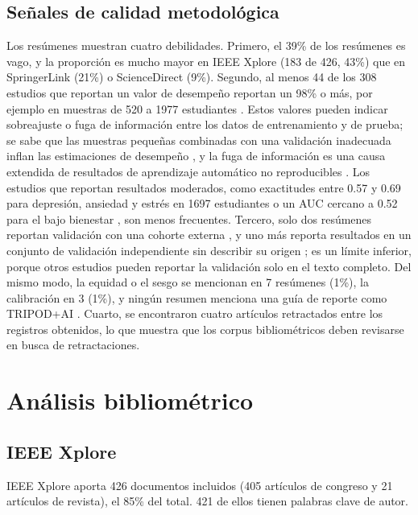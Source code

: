 \documentclass[11pt,a4paper]{article}
\begin{document}
\subsection{Señales de calidad metodológica}

Los resúmenes muestran cuatro debilidades. Primero, el 39\% de los resúmenes es vago, y la proporción es mucho mayor en IEEE Xplore (183 de 426, 43\%) que en SpringerLink (21\%) o ScienceDirect (9\%). Segundo, al menos 44 de los 308 estudios que reportan un valor de desempeño reportan un 98\% o más, por ejemplo en muestras de 520 a 1977 estudiantes \cite{S009,S033,D073}. Estos valores pueden indicar sobreajuste o fuga de información entre los datos de entrenamiento y de prueba; se sabe que las muestras pequeñas combinadas con una validación inadecuada inflan las estimaciones de desempeño \cite{vabalas2019validation}, y la fuga de información es una causa extendida de resultados de aprendizaje automático no reproducibles \cite{kapoor2023leakage}. Los estudios que reportan resultados moderados, como exactitudes entre 0.57 y 0.69 para depresión, ansiedad y estrés en 1697 estudiantes \cite{S025} o un AUC cercano a 0.52 para el bajo bienestar \cite{I186}, son menos frecuentes. Tercero, solo dos resúmenes reportan validación con una cohorte externa \cite{S005,S021}, y uno más reporta resultados en un conjunto de validación independiente sin describir su origen \cite{I857}; es un límite inferior, porque otros estudios pueden reportar la validación solo en el texto completo. Del mismo modo, la equidad o el sesgo se mencionan en 7 resúmenes (1\%), la calibración en 3 (1\%), y ningún resumen menciona una guía de reporte como TRIPOD+AI \cite{collins2024tripodai}. Cuarto, se encontraron cuatro artículos retractados entre los registros obtenidos, lo que muestra que los corpus bibliométricos deben revisarse en busca de retractaciones.

\section{Análisis bibliométrico}\label{sec:biblio}

\subsection{IEEE Xplore}

IEEE Xplore aporta 426 documentos incluidos (405 artículos de congreso y 21 artículos de revista), el 85\% del total. 421 de ellos tienen palabras clave de autor.
\end{document}

